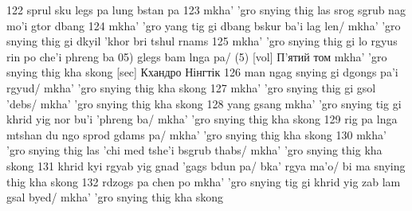 \documentclass{article}
\begin{document}
122 sprul sku legs pa lung bstan pa
123 mkha' 'gro snying thig las srog sgrub nag mo'i gtor dbang
124 mkha' 'gro yang tig gi dbang bskur ba'i lag len/ mkha' 'gro snying thig gi dkyil 'khor bri tshul rnams
125 mkha' 'gro snying thig gi lo rgyus rin po che'i phreng ba
05) glegs bam lnga pa/ (5) [vol] П'ятий том
mkha' 'gro snying thig kha skong [sec] Кхандро Нінгтік
126 man ngag snying gi dgongs pa'i rgyud/ mkha' 'gro snying thig kha skong
127 mkha' 'gro snying thig gi gsol 'debs/ mkha' 'gro snying thig kha skong
128 yang gsang mkha' 'gro snying tig gi khrid yig nor bu'i 'phreng ba/ mkha' 'gro snying thig kha skong
129 rig pa lnga mtshan du ngo sprod gdams pa/ mkha' 'gro snying thig kha skong
130 mkha' 'gro snying thig las 'chi med tshe'i bsgrub thabs/ mkha' 'gro snying thig kha skong
131 khrid kyi rgyab yig gnad 'gags bdun pa/ bka' rgya ma'o/ bi ma snying thig kha skong
132 rdzogs pa chen po mkha' 'gro snying tig gi khrid yig zab lam gsal byed/ mkha' 'gro snying thig kha skong
\end{document}

